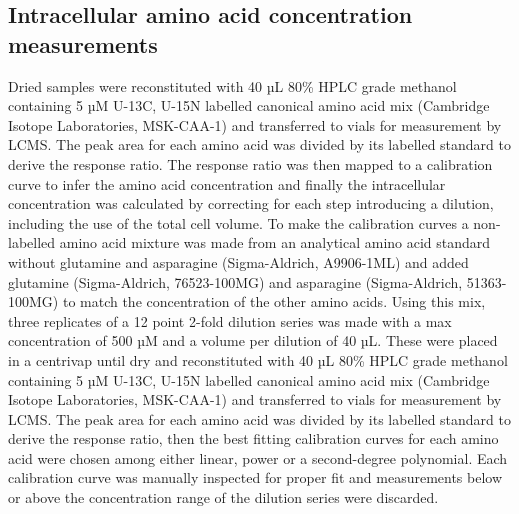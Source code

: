 \documentclass[9pt,lineno]{elife}
\begin{document}
\subsection{Intracellular amino acid concentration measurements}
Dried samples were reconstituted with 40 µL 80\% HPLC grade methanol containing 5 µM U-13C, U-15N labelled canonical amino acid mix (Cambridge Isotope Laboratories, MSK-CAA-1) and transferred to vials for measurement by LCMS.
The peak area for each amino acid was divided by its labelled standard to derive the response ratio.
The response ratio was then mapped to a calibration curve to infer the amino acid concentration and finally the intracellular concentration was calculated by correcting for each step introducing a dilution, including the use of the total cell volume.
To make the calibration curves a non-labelled amino acid mixture was made from an analytical amino acid standard without glutamine and asparagine (Sigma-Aldrich, A9906-1ML) and added glutamine (Sigma-Aldrich, 76523-100MG) and asparagine (Sigma-Aldrich, 51363-100MG) to match the concentration of the other amino acids.
Using this mix, three replicates of a 12 point 2-fold dilution series was made with a max concentration of 500 µM and a volume per dilution of 40 µL.
These were placed in a centrivap until dry and reconstituted with 40 µL 80\% HPLC grade methanol containing 5 µM U-13C, U-15N labelled canonical amino acid mix (Cambridge Isotope Laboratories, MSK-CAA-1) and transferred to vials for measurement by LCMS. The peak area for each amino acid was divided by its labelled standard to derive the response ratio, then the best fitting calibration curves for each amino acid were chosen among either linear, power or a second-degree polynomial. Each calibration curve was manually inspected for proper fit and measurements below or above the concentration range of the dilution series were discarded.
\end{document}
